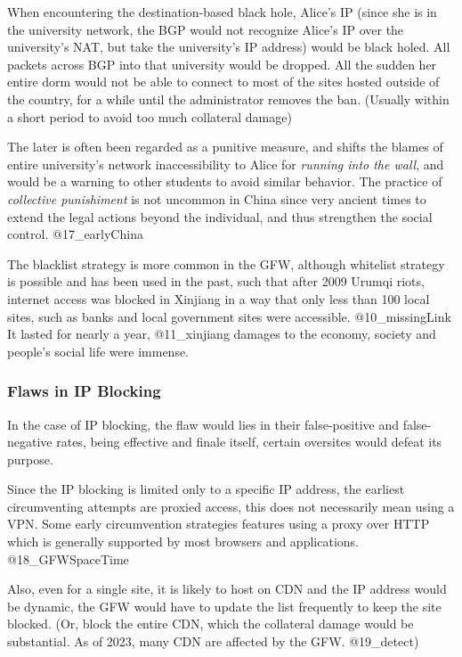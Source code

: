 When encountering the destination-based black hole, Alice's IP (since
she is in the university network, the BGP would not recognize Alice's IP
over the university's NAT, but take the university's IP address) would
be black holed. All packets across BGP into that university would be
dropped. All the sudden her entire dorm would not be able to connect to
most of the sites hosted outside of the country, for a while until the
administrator removes the ban. (Usually within a short period to avoid
too much collateral damage)

The later is often been regarded as a punitive measure, and shifts the
blames of entire university's network inaccessibility to Alice for
\emph{running into the wall}, and would be a warning to other students
to avoid similar behavior. The practice of \emph{collective punishiment}
is not uncommon in China since very ancient times to extend the legal
actions beyond the individual, and thus strengthen the social control.
@17\_earlyChina

The blacklist strategy is more common in the GFW, although whitelist
strategy is possible and has been used in the past, such that after 2009
Urumqi riots, internet access was blocked in Xinjiang in a way that only
less than 100 local sites, such as banks and local government sites were
accessible. @10\_missingLink It lasted for nearly a year, @11\_xinjiang
damages to the economy, society and people's social life were immense.

\hypertarget{flaws-in-ip-blocking}{%
\subsubsection{Flaws in IP Blocking}\label{flaws-in-ip-blocking}}

In the case of IP blocking, the flaw would lies in their false-positive
and false-negative rates, being effective and finale itself, certain
oversites would defeat its purpose.

Since the IP blocking is limited only to a specific IP address, the
earliest circumventing attempts are proxied access, this does not
necessarily mean using a VPN. Some early circumvention strategies
features using a proxy over HTTP which is generally supported by most
browsers and applications. @18\_GFWSpaceTime

Also, even for a single site, it is likely to host on CDN and the IP
address would be dynamic, the GFW would have to update the list
frequently to keep the site blocked. (Or, block the entire CDN, which
the collateral damage would be substantial. As of 2023, many CDN are
affected by the GFW. @19\_detect)

